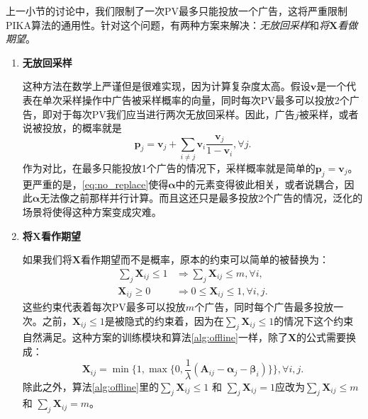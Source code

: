 上一小节的讨论中，我们限制了一次PV最多只能投放一个广告，这将严重限制PIKA算法的通用性。针对这个问题，有两种方案来解决：\textit{无放回采样}和\textit{将$\bm{X}$看做期望}。
\begin{enumerate}[1)]
	\item \textbf{无放回采样}
	
	这种方法在数学上严谨但是很难实现，因为计算复杂度太高。假设$\bm{v}$是一个代表在单次采样操作中广告被采样概率的向量，同时每次PV最多可以投放2个广告，即对于每次PV我们应当进行两次无放回采样。因此，广告$j$被采样，或者说被投放，的概率就是
	\begin{equation}
	\bm{p}_j = \bm{v}_j + \sum_{i \ne j}\bm{v}_i\frac{\bm{v}_j}{1 - \bm{v}_i}, \forall j.
	\label{eq:no_replace}
	\end{equation}
	作为对比，在最多只能投放1个广告的情况下，采样概率就是简单的$\bm{p}_j = \bm{v}_j$。更严重的是，\eqref{eq:no_replace}使得$\bm{\alpha}$中的元素变得彼此相关，或者说耦合，因此$\bm{\alpha}$无法像之前那样并行计算。而且这还只是最多投放2个广告的情况，泛化的场景将使得这种方案变成灾难。
	
	\item \textbf{将$\bm{X}$看作期望}
	
	如果我们将$\bm{X}$看作期望而不是概率，原本的约束可以简单的被替换为：
	\begin{equation}
	\begin{aligned}
	\sum_j{\bm{X}_{ij}} \le 1 &\Rightarrow \sum_j{\bm{X}_{ij}} \le m, \forall i, \\
	\bm{X}_{ij} \ge 0 &\Rightarrow 0 \le \bm{X}_{ij} \le 1, \forall i, j. 
	\end{aligned}
	\end{equation}
	这些约束代表着每次PV最多可以投放$m$个广告，同时每个广告最多投放一次。之前，$\bm{X}_{ij} \le 1$是被隐式的约束着，因为在$\sum_j{\bm{X}_{ij}} \le 1$的情况下这个约束自然满足。这种方案的训练模块和算法\ref{alg:offline}一样，除了$\bm{X}$的公式需要换成：
	\begin{equation}
	\bm{X}_{ij} =\min\{1, \max\{0, \frac{1}{\lambda} (\bm{A}_{ij} - \bm{\alpha}_j - \bm{\beta}_i)\}\}, \forall i, j. 
	\end{equation}
	除此之外，算法\ref{alg:offline}里的$\sum_j{\bm{X}_{ij}} \le 1$ 和 $\sum_j{\bm{X}_{ij}} = 1$应改为$\sum_j{\bm{X}_{ij}} \le m$ 和 $\sum_j{\bm{X}_{ij}} = m$。
	

\end{enumerate}
